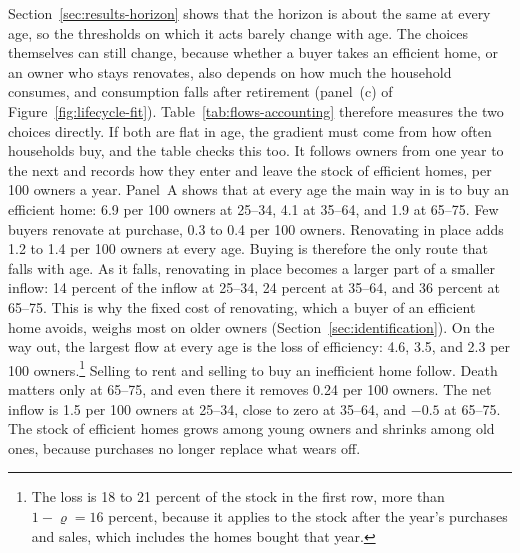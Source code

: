  Section~\ref{sec:results-horizon} shows that the horizon is about the
same at every age, so the thresholds on which it acts barely change with
age. The choices themselves can still change, because whether a buyer takes
an efficient home, or an owner who stays renovates, also depends on how much
the household consumes, and consumption falls after retirement (panel~(c) of
Figure~\ref{fig:lifecycle-fit}). Table~\ref{tab:flows-accounting} therefore
measures the two choices directly. If both are flat in age, the gradient
must come from how often households buy, and the table checks this too. It follows
owners from one year to the next
and records how they enter and leave the stock of efficient homes, per 100
owners a year. Panel~A shows that at every age the main way in is to buy an
efficient home: 6.9 per 100 owners at 25--34, 4.1 at 35--64, and 1.9 at
65--75. Few buyers renovate at purchase, 0.3 to 0.4 per 100 owners.
Renovating in place adds 1.2 to 1.4 per 100 owners at every age. Buying is
therefore the only route that falls with age. As it falls, renovating in
place becomes a larger part of a smaller inflow: 14 percent of the inflow at
25--34, 24 percent at 35--64, and 36 percent at 65--75. This is why the
fixed cost of renovating, which a buyer of an efficient home avoids, weighs
most on older owners (Section~\ref{sec:identification}). On the way out,
the largest flow at every age is the loss of efficiency: 4.6, 3.5, and 2.3
per 100 owners.\footnote{ The loss is 18 to 21 percent of the stock in
the first row, more than $1-\varrho=16$ percent, because it applies to the
stock after the year's purchases and sales, which includes the homes bought
that year.} Selling to rent and selling to buy an inefficient home follow.
Death matters only at 65--75, and even there it removes 0.24 per 100
owners. The net inflow is 1.5 per 100 owners at 25--34, close to zero at
35--64, and $-0.5$ at 65--75. The stock of efficient homes grows among young
owners and shrinks among old ones, because purchases no longer replace what
wears off.

